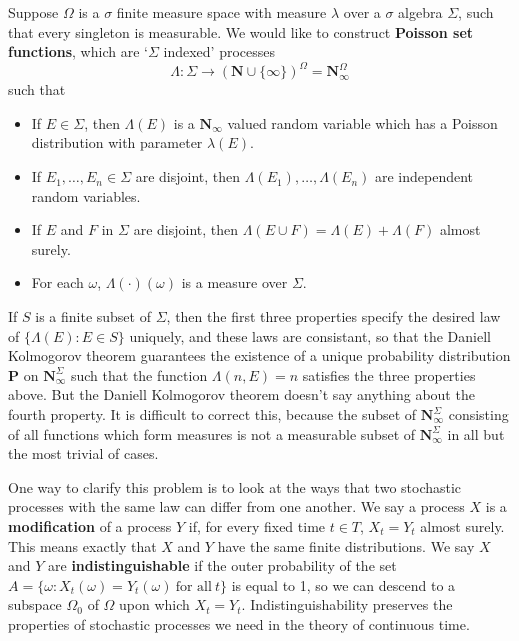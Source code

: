 \begin{example}
    Suppose $\Omega$ is a $\sigma$ finite measure space with measure $\lambda$ over a $\sigma$ algebra $\Sigma$, such that every singleton is measurable. We would like to construct {\bf Poisson set functions}, which are `$\Sigma$ indexed' processes
    \[ \Lambda: \Sigma \to (\mathbf{N} \cup \{ \infty \})^\Omega = \mathbf{N}_\infty^\Omega \]
    such that
    \begin{itemize}
        \item If $E \in \Sigma$, then $\Lambda(E)$ is a $\mathbf{N}_\infty$ valued random variable which has a Poisson distribution with parameter $\lambda(E)$.
        \item If $E_1, \dots, E_n \in \Sigma$ are disjoint, then $\Lambda(E_1), \dots, \Lambda(E_n)$ are independent random variables.
        \item If $E$ and $F$ in $\Sigma$ are disjoint, then $\Lambda(E \cup F) = \Lambda(E) + \Lambda(F)$ almost surely.
        \item For each $\omega$, $\Lambda(\cdot)(\omega)$ is a measure over $\Sigma$.
    \end{itemize}
    If $S$ is a finite subset of $\Sigma$, then the first three properties specify the desired law of $\{ \Lambda(E) : E \in S \}$ uniquely, and these laws are consistant, so that the Daniell Kolmogorov theorem guarantees the existence of a unique probability distribution $\mathbf{P}$ on $\mathbf{N}_\infty^\Sigma$ such that the function $\Lambda(n,E) = n$ satisfies the three properties above. But the Daniell Kolmogorov theorem doesn't say anything about the fourth property. It is difficult to correct this, because the subset of $\mathbf{N}_\infty^\Sigma$ consisting of all functions which form measures is not a measurable subset of $\mathbf{N}_\infty^\Sigma$ in all but the most trivial of cases.
\end{example}

One way to clarify this problem is to look at the ways that two stochastic processes with the same law can differ from one another. We say a process $X$ is a {\bf modification} of a process $Y$ if, for every fixed time $t \in T$, $X_t = Y_t$ almost surely. This means exactly that $X$ and $Y$ have the same finite distributions. We say $X$ and $Y$ are {\bf indistinguishable} if the outer probability of the set $A = \{ \omega: X_t(\omega) = Y_t(\omega)\ \text{for all}\ t \}$ is equal to 1, so we can descend to a subspace $\Omega_0$ of $\Omega$ upon which $X_t = Y_t$. Indistinguishability preserves the properties of stochastic processes we need in the theory of continuous time.

